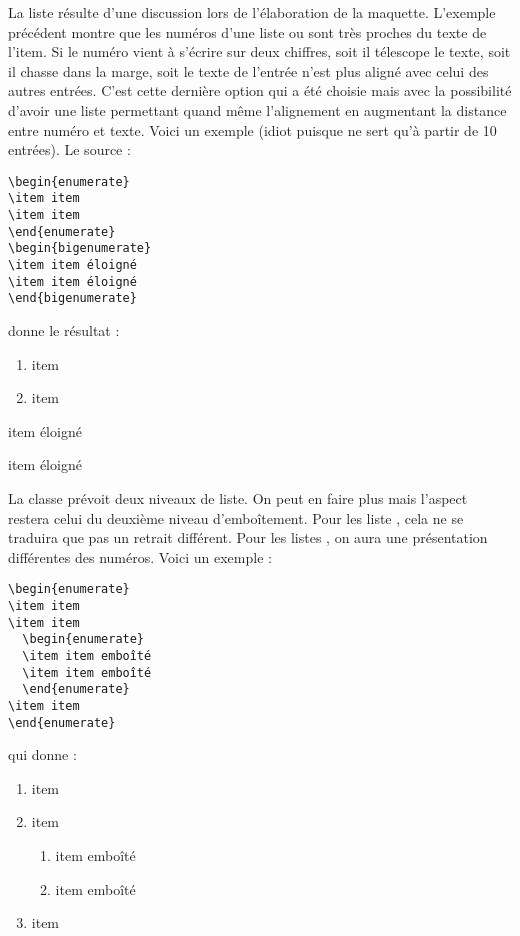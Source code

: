 \documentclass[nocrop]{sesamanuel}
\begin{document}
La liste  résulte d'une discussion lors de
l'élaboration de la maquette. L'exemple précédent montre que les
numéros d'une liste  ou  sont
très proches du texte de l'item. Si le numéro vient à s'écrire sur
deux chiffres, soit il télescope le texte, soit il chasse dans la
marge, soit le texte de l'entrée n'est plus aligné avec celui des
autres entrées. C'est cette dernière option qui a été choisie mais
avec la possibilité d'avoir une liste permettant quand même
l'alignement en augmentant la distance entre numéro et texte. Voici un
exemple (idiot puisque  ne sert qu'à partir de
10 entrées). Le source :
\begin{verbatim}
\begin{enumerate}
\item item
\item item
\end{enumerate}
\begin{bigenumerate}
\item item éloigné
\item item éloigné
\end{bigenumerate}
\end{verbatim}
donne le résultat :
\begingroup
{}%
\begin{enumerate}
\item item
\item item
\end{enumerate}
\begin{bigenumerate}
\item item éloigné
\item item éloigné
\end{bigenumerate}
\endgroup
La classe prévoit deux niveaux de liste. On peut en faire plus mais
l'aspect restera celui du deuxième niveau d'emboîtement. Pour les
liste , cela ne se traduira que pas un retrait
différent. Pour les listes , on aura une
présentation différentes des numéros. Voici un exemple :
\begin{verbatim}
\begin{enumerate}
\item item
\item item
  \begin{enumerate}
  \item item emboîté
  \item item emboîté
  \end{enumerate}
\item item
\end{enumerate}
\end{verbatim}
qui donne :
\begingroup
{}%
\begin{enumerate}
\item item
\item item
  \begin{enumerate}
  \item item emboîté
  \item item emboîté
  \end{enumerate}
\item item
\end{enumerate}
\endgroup
\end{document}
